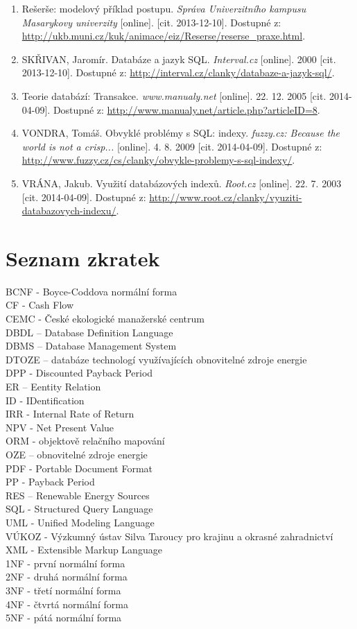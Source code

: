 \documentclass[11pt,a4paper]{article}
\begin{document}
\begin{enumerate}
\item Rešerše: modelový příklad postupu. \textit{Správa Univerzitního kampusu Masarykovy univerzity} [online]. [cit. 2013-12-10]. Dostupné z: \url{http://ukb.muni.cz/kuk/animace/eiz/Reserse/reserse_praxe.html}.
\item SKŘIVAN, Jaromír. Databáze a jazyk SQL. \textit{Interval.cz} [online]. 2000 [cit. 2013-12-10]. Dostupné z: \url{http://interval.cz/clanky/databaze-a-jazyk-sql/}.
\item Teorie databází: Transakce. \textit{www.manualy.net} [online]. 22. 12. 2005 [cit. 2014-04-09]. Dostupné z: \url{http://www.manualy.net/article.php?articleID=8}.
\item VONDRA, Tomáš. Obvyklé problémy s SQL: indexy. \textit{fuzzy.cz: Because the world is not a crisp...} [online]. 4. 8. 2009 [cit. 2014-04-09]. Dostupné z: \url{http://www.fuzzy.cz/cs/clanky/obvykle-problemy-s-sql-indexy/}.
\item VRÁNA, Jakub. Využití databázových indexů. \textit{Root.cz} [online]. 22. 7. 2003 [cit. 2014-04-09]. Dostupné z: \url{http://www.root.cz/clanky/vyuziti-databazovych-indexu/}.
\end{enumerate}
\newpage

\appendix 
\section{Seznam zkratek}
BCNF - Boyce-Coddova normální forma\\
CF - Cash Flow\\
CEMC - České ekologické manažerské centrum\\
DBDL – Database Definition Language\\
DBMS – Database Management System\\
DTOZE – databáze technologí využívajících obnovitelné zdroje energie\\
DPP - Discounted Payback Period\\
ER – Eentity Relation\\
ID - IDentification\\
IRR - Internal Rate of Return\\
NPV - Net Present Value\\
ORM - objektově relačního mapování\\
OZE – obnovitelné zdroje energie\\
PDF - Portable Document Format\\
PP - Payback Period\\
RES – Renewable Energy Sources\\
SQL - Structured Query Language\\
UML - Unified Modeling Language\\
VÚKOZ - Výzkumný ústav Silva Taroucy pro krajinu a okrasné zahradnictví\\
XML - Extensible Markup Language\\
1NF - první normální forma \\
2NF - druhá normální forma \\
3NF - třetí normální forma \\
4NF - čtvrtá normální forma\\
5NF - pátá normální forma
\end{document}
